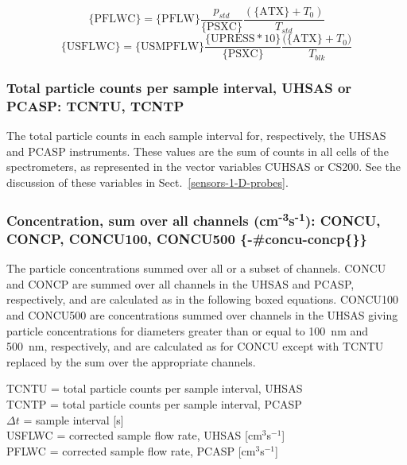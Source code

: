 \documentclass[
  english,
]{book}
\begin{document}
\begin{equation}
\mathrm{\{PFLWC\}}=\mathrm{\{PFLW\}}\frac{p_{std}}{\mathrm{\{PSXC\}}}\frac{(\mathrm{\{ATX\}}+T_{0})}{T_{std}}  
\label{eq:PFLWCbox1}
\end{equation}
\begin{equation}
\mathrm{\{USFLWC\}}=\mathrm{\{USMPFLW\}}\frac{\mathrm{\{UPRESS*10\}}}{\mathrm{\{PSXC\}}}\frac{\mathrm{(\{ATX\}}+T_{0})}{T_{blk}}  
\label{eq:PFLWCbox2}
\end{equation}

\hypertarget{tcntu-tcntp}{%
\subsubsection*{Total particle counts per sample interval, UHSAS or PCASP: TCNTU, TCNTP}\label{tcntu-tcntp}}

The total particle counts in each sample interval for, respectively, the UHSAS and PCASP instruments. These values are the sum of counts in all cells of the spectrometers, as represented in the vector variables CUHSAS or CS200. See the discussion of these variables in Sect.~\ref{sensors-1-D-probes}.

\hypertarget{concentration-sum-over-all-channels-cm-3s-1-concu-concp-concu100-concu500--concu-concp}{%
\subsubsection{\texorpdfstring{Concentration, sum over all channels (cm\textsuperscript{-3}s\textsuperscript{-1}): CONCU, CONCP, CONCU100, CONCU500 \{-\#concu-concp\{\}\}}{Concentration, sum over all channels (cm-3s-1): CONCU, CONCP, CONCU100, CONCU500 \{-\#concu-concp\{\}\}}}\label{concentration-sum-over-all-channels-cm-3s-1-concu-concp-concu100-concu500--concu-concp}}

The particle concentrations summed over all or a subset of channels. CONCU and CONCP are summed over all channels in the UHSAS and PCASP, respectively, and are calculated as in the following boxed equations. CONCU100 and CONCU500 are concentrations summed over channels in the UHSAS giving particle concentrations for diameters greater than or equal to 100~nm and 500~nm, respectively, and are calculated as for CONCU except with TCNTU replaced by the sum over the appropriate channels.

TCNTU = total particle counts per sample interval, UHSAS\\
TCNTP = total particle counts per sample interval, PCASP\\
\(\Delta t\) = sample
interval {[}s{]}\\
USFLWC = corrected sample flow rate, UHSAS {[}cm\(^{3}\)s\(^{-1}\){]}\\
PFLWC = corrected sample flow rate, PCASP {[}cm\(^{3}\)s\(^{-1}\){]}
\end{document}
